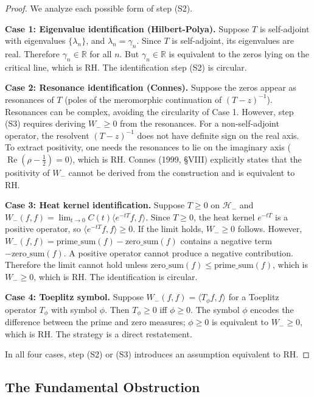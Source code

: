 \documentclass[12pt]{article}
\DeclareMathOperator{\Re}{Re}
\newcommand{\RR}{\mathbb{R}}
\newcommand{\Hminus}{\mathcal{H}_-}
\begin{document}
\begin{proof}
We analyze each possible form of step (S2).

\textbf{Case 1: Eigenvalue identification (Hilbert-Polya).}
Suppose $T$ is self-adjoint with eigenvalues $\{\lambda_n\}$, and
$\lambda_n = \gamma_n$. Since $T$ is self-adjoint, its eigenvalues are real.
Therefore $\gamma_n \in \RR$ for all $n$. But $\gamma_n \in \RR$ is
equivalent to the zeros lying on the critical line, which is RH. The
identification step (S2) is circular.

\textbf{Case 2: Resonance identification (Connes).}
Suppose the zeros appear as resonances of $T$ (poles of the meromorphic
continuation of $(T-z)^{-1}$). Resonances can be complex, avoiding the
circularity of Case 1. However, step (S3) requires deriving $W_- \geq 0$
from the resonances. For a non-self-adjoint operator, the resolvent
$(T-z)^{-1}$ does not have definite sign on the real axis. To extract
positivity, one needs the resonances to lie on the imaginary axis
($\Re(\rho - \frac{1}{2}) = 0$), which is RH. Connes (1999, \S VIII)
explicitly states that the positivity of $W_-$ cannot be derived from
the construction and is equivalent to RH.

\textbf{Case 3: Heat kernel identification.}
Suppose $T \geq 0$ on $\Hminus$ and
$W_-(f,f) = \lim_{t \to 0} C(t) \langle e^{-tT} f, f \rangle$.
Since $T \geq 0$, the heat kernel $e^{-tT}$ is a positive operator, so
$\langle e^{-tT} f, f \rangle \geq 0$. If the limit holds, $W_- \geq 0$
follows. However, $W_-(f,f) = \text{prime\_sum}(f) - \text{zero\_sum}(f)$
contains a negative term $-\text{zero\_sum}(f)$. A positive operator cannot
produce a negative contribution. Therefore the limit cannot hold unless
$\text{zero\_sum}(f) \leq \text{prime\_sum}(f)$, which is $W_- \geq 0$,
which is RH. The identification is circular.

\textbf{Case 4: Toeplitz symbol.}
Suppose $W_-(f,f) = \langle T_\phi f, f \rangle$ for a Toeplitz operator
$T_\phi$ with symbol $\phi$. Then $T_\phi \geq 0$ iff $\phi \geq 0$.
The symbol $\phi$ encodes the difference between the prime and zero measures;
$\phi \geq 0$ is equivalent to $W_- \geq 0$, which is RH. The strategy
is a direct restatement.

In all four cases, step (S2) or (S3) introduces an assumption equivalent
to RH.
\end{proof}

\subsection{The Fundamental Obstruction}
\end{document}
